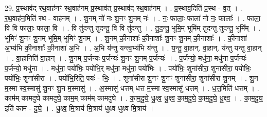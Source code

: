 \documentclass[17pt]{extarticle}
\begin{document}
29. प्र॒स्थाव॑द् रथ॒वाह॑नꣳ रथ॒वाह॑नम् प्र॒स्थाव॑त् प्र॒स्थाव॑द् रथ॒वाह॑नम् । . प्र॒स्थाव॒दिति॑ प्र॒स्थ - व॒त् । . र॒थ॒वाह॑न॒मिति॑ रथ - वाह॑नम् । . शु॒नम् नो॑ नः शु॒नꣳ शु॒नम् नः॑ । . नः॒ फालाः॒ फाला॑ नो नः॒ फालाः᳚ । . फाला॒ वि वि फालाः॒ फाला॒ वि । . वि तु॑दन्तु तुदन्तु॒ वि वि तु॑दन्तु । . तु॒द॒न्तु॒ भूमि॒म् भूमि॑म् तुदन्तु तुदन्तु॒ भूमि᳚म् । . भूमिꣳ॑ शु॒नꣳ शु॒नम् भूमि॒म् भूमिꣳ॑ शु॒नम् । . शु॒नम् की॒नाशाः᳚ की॒नाशाः᳚ शु॒नꣳ शु॒नम् की॒नाशाः᳚ । . की॒नाशा॑ अ॒भ्य॑भि की॒नाशाः᳚ की॒नाशा॑ अ॒भि । . अ॒भि य॑न्तु यन्त्व॒भ्य॑भि य॑न्तु । . य॒न्तु॒ वा॒हान्. वा॒हान्. य॑न्तु यन्तु वा॒हान् । . वा॒हानिति॑ वा॒हान् । . शु॒नम् प॒र्जन्यः॑ प॒र्जन्यः॑ शु॒नꣳ शु॒नम् प॒र्जन्यः॑ । . प॒र्जन्यो॒ मधु॑ना॒ मधु॑ना प॒र्जन्यः॑ प॒र्जन्यो॒ मधु॑ना । . मधु॑ना॒ पयो॑भिः॒ पयो॑भि॒र् मधु॑ना॒ मधु॑ना॒ पयो॑भिः । . पयो॑भिः॒ शुना॑सीरा॒ शुना॑सीरा॒ पयो॑भिः॒ पयो॑भिः॒ शुना॑सीरा । . पयो॑भि॒रिति॒ पयः॑ - भिः॒ । . शुना॑सीरा शु॒नꣳ शु॒नꣳ शुना॑सीरा॒ शुना॑सीरा शु॒नम् । . शु॒न म॒स्मा स्व॒स्मासु॑ शु॒नꣳ शु॒न म॒स्मासु॑ । . अ॒स्मासु॑ धत्तम् धत्त म॒स्मा स्व॒स्मासु॑ धत्तम् । . ध॒त्त॒मिति॑ धत्तम् । . काम॑म् कामदुघे कामदुघे॒ काम॒म् काम॑म् कामदुघे । . का॒म॒दु॒घे॒ धु॒क्ष्व॒ धु॒क्ष्व॒ का॒म॒दु॒घे॒ का॒म॒दु॒घे॒ धु॒क्ष्व॒ । . का॒म॒दु॒घ॒ इति॑ काम - दु॒घे॒ । . धु॒क्ष्व॒ मि॒त्राय॑ मि॒त्राय॑ धुक्ष्व धुक्ष्व मि॒त्राय॑ । \newline
\end{document}
